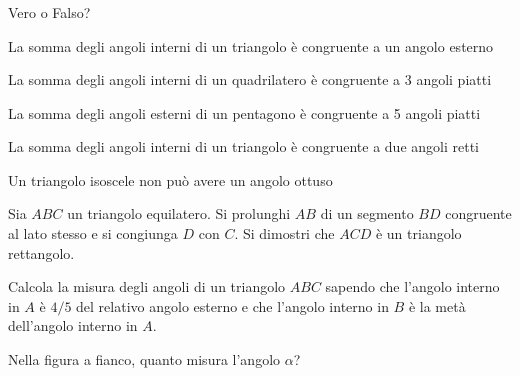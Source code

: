 \subsubsection*{}

\begin{esercizio}
\label{ese:3.47}
Vero o Falso?
\begin{enumeratea}
\item La somma degli angoli interni di un triangolo è congruente a un 
angolo esterno \hfill\boxV\quad\boxF
\item La somma degli angoli interni di un quadrilatero è congruente a 
3 angoli piatti \hfill\boxV\quad\boxF
\item La somma degli angoli esterni di un pentagono è congruente a 5 
angoli piatti\hfill\boxV\quad\boxF
\item La somma degli angoli interni di un triangolo è congruente a 
due angoli retti\hfill\boxV\quad\boxF
\item Un triangolo isoscele non può avere un angolo 
ottuso\hfill\boxV\quad\boxF
\end{enumeratea}
\end{esercizio}

\begin{minipage}{.69\textwidth}
 \begin{esercizio}
\label{ese:3.48}
Sia \(ABC\) un triangolo equilatero. Si prolunghi \(AB\) di un segmento 
\(BD\) congruente al lato stesso e si congiunga \(D\) con \(C\). Si 
dimostri che \(ACD\) è un triangolo rettangolo.
\end{esercizio}

\begin{esercizio}
\label{ese:3.49}
Calcola la misura degli angoli di un triangolo \(ABC\) sapendo che 
l'angolo interno in \(A\) è \(4/5\) del relativo angolo esterno e che 
l'angolo interno in \(B\) è la metà dell'angolo interno in \(A\).
\end{esercizio}

\begin{esercizio}
\label{ese:3.51}
Nella figura a fianco, quanto misura l'angolo \(\alpha\)?
\end{esercizio}
\end{minipage}  
\begin{minipage}{.29\textwidth}
\vspace{-20mm}
\begin{inaccessibleblock}
\begin{center}\end{center}
\end{inaccessibleblock}
\end{minipage}

